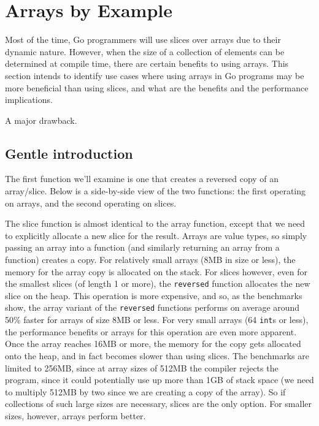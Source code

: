 \section{Arrays by Example}

Most of the time, Go programmers will use slices over arrays due to their
dynamic nature. However, when the size of a collection of elements can be
determined at compile time, there are certain benefits to using arrays. This
section intends to identify use cases where using arrays in Go programs may be
more beneficial than using slices, and what are the benefits and the performance
implications.

A major drawback.

\subsection{Gentle introduction}

The first function we'll examine is one that creates a reversed copy of an
array/slice. Below is a side-by-side view of the two functions: the first
operating on arrays, and the second operating on slices.


The slice function is almost identical to the array function, except that we
need to explicitly allocate a new slice for the result. Arrays are value types,
so simply passing an array into a function (and similarly returning an array
from a function) creates a copy. For relatively small arrays (8MB in size or
less), the memory for the array copy is allocated on the stack. For slices
however, even for the smallest slices (of length 1 or more), the
\texttt{reversed} function allocates the new slice on the heap. This operation
is more expensive, and so, as the benchmarks show, the array variant of the
\texttt{reversed} functions performs on average around 50\% faster for arrays of
size 8MB or less. For very small arrays (64 \texttt{int}s or less), the
performance benefits or arrays for this operation are even more apparent. Once
the array reaches 16MB or more, the memory for the copy gets allocated onto the
heap, and in fact becomes slower than using slices. The benchmarks are limited
to 256MB, since at array sizes of 512MB the compiler rejects the program, since
it could potentially use up more than 1GB of stack space (we need to multiply
512MB by two since we are creating a copy of the array). So if collections of
such large sizes are necessary, slices are the only option. For smaller sizes,
however, arrays perform better.


